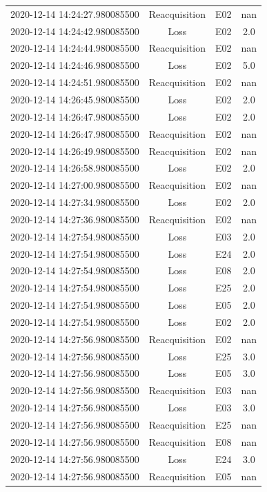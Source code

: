 \begin{enumerate}
\begin{longtabu}{cccc}
2020{-}12{-}14 14:24:27.980085500&Reacquisition&E02&nan\\%
2020{-}12{-}14 14:24:42.980085500&Loss&E02&2.0\\%
2020{-}12{-}14 14:24:44.980085500&Reacquisition&E02&nan\\%
2020{-}12{-}14 14:24:46.980085500&Loss&E02&5.0\\%
2020{-}12{-}14 14:24:51.980085500&Reacquisition&E02&nan\\%
2020{-}12{-}14 14:26:45.980085500&Loss&E02&2.0\\%
2020{-}12{-}14 14:26:47.980085500&Loss&E02&2.0\\%
2020{-}12{-}14 14:26:47.980085500&Reacquisition&E02&nan\\%
2020{-}12{-}14 14:26:49.980085500&Reacquisition&E02&nan\\%
2020{-}12{-}14 14:26:58.980085500&Loss&E02&2.0\\%
2020{-}12{-}14 14:27:00.980085500&Reacquisition&E02&nan\\%
2020{-}12{-}14 14:27:34.980085500&Loss&E02&2.0\\%
2020{-}12{-}14 14:27:36.980085500&Reacquisition&E02&nan\\%
2020{-}12{-}14 14:27:54.980085500&Loss&E03&2.0\\%
2020{-}12{-}14 14:27:54.980085500&Loss&E24&2.0\\%
2020{-}12{-}14 14:27:54.980085500&Loss&E08&2.0\\%
2020{-}12{-}14 14:27:54.980085500&Loss&E25&2.0\\%
2020{-}12{-}14 14:27:54.980085500&Loss&E05&2.0\\%
2020{-}12{-}14 14:27:54.980085500&Loss&E02&2.0\\%
2020{-}12{-}14 14:27:56.980085500&Reacquisition&E02&nan\\%
2020{-}12{-}14 14:27:56.980085500&Loss&E25&3.0\\%
2020{-}12{-}14 14:27:56.980085500&Loss&E05&3.0\\%
2020{-}12{-}14 14:27:56.980085500&Reacquisition&E03&nan\\%
2020{-}12{-}14 14:27:56.980085500&Loss&E03&3.0\\%
2020{-}12{-}14 14:27:56.980085500&Reacquisition&E25&nan\\%
2020{-}12{-}14 14:27:56.980085500&Reacquisition&E08&nan\\%
2020{-}12{-}14 14:27:56.980085500&Loss&E24&3.0\\%
2020{-}12{-}14 14:27:56.980085500&Reacquisition&E05&nan\\%

\end{longtabu}
\end{enumerate}
